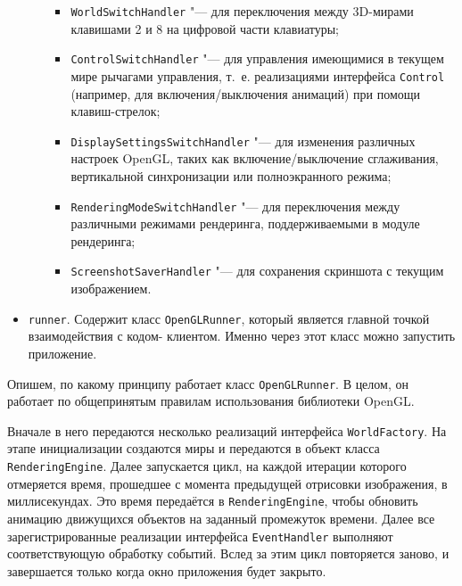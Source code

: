 \begin{itemize}
\begin{itemize}
        \begin{itemize}
        \item \texttt{WorldSwitchHandler} "--- для переключения между 3D-мирами клавишами 2 и 8 на цифровой части
        клавиатуры;
        \item \texttt{ControlSwitchHandler} "--- для управления имеющимися в текущем мире рычагами управления, т.~е.
        реализациями интерфейса \texttt{Control} (например, для включения/выключения анимаций) при помощи кла\-виш-стрелок;
        \item \texttt{DisplaySettingsSwitchHandler} "--- для изменения различных настроек OpenGL, таких как
        включение/выключение сглаживания, вертикальной синхронизации или полноэкранного режима;
        \item \texttt{RenderingModeSwitchHandler} "--- для переключения между различными режимами рендеринга,
        поддерживаемыми в модуле рендеринга;
        \item \texttt{ScreenshotSaverHandler} "--- для сохранения скриншота с текущим изображением.
        \end{itemize}

    \end{itemize}

\item \texttt{runner}. Содержит класс \texttt{OpenGLRunner}, который является главной точкой взаимодействия с кодом-
клиентом. Именно через этот класс можно запустить приложение.

\end{itemize}

Опишем, по какому принципу работает класс \texttt{OpenGLRunner}. В целом, он работает по общепринятым правилам
использования библиотеки OpenGL.

Вначале в него передаются несколько реализаций интерфейса \texttt{WorldFac\-tory}. На этапе инициализации создаются миры
и передаются в объект класса \texttt{Rende\-ringEngine}. Далее запускается цикл, на каждой итерации которого отмеряется
время, прошедшее с момента предыдущей отрисовки изображения, в миллисекундах. Это время передаётся в
\texttt{RenderingEngine}, чтобы обновить анимацию движущихся объектов на заданный промежуток времени. Далее все
зарегистрированные реализации интерфейса \texttt{EventHandler} выполняют соответствующую обработку событий. Вслед
за этим цикл повторяется заново, и завершается только когда окно приложения будет закрыто.
